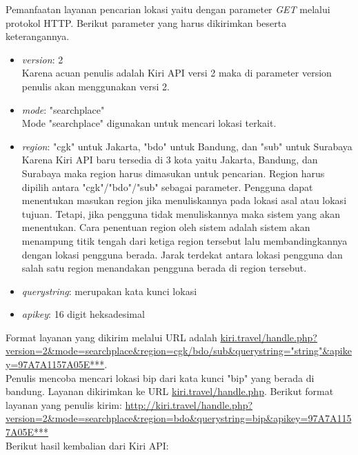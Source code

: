 Pemanfaatan layanan pencarian lokasi yaitu dengan parameter \textit{GET} melalui protokol HTTP. Berikut parameter yang harus dikirimkan beserta keterangannya.
\begin{itemize}
	\item \textit{version}: 2 \\
	Karena acuan penulis adalah Kiri API versi 2 maka di parameter version penulis akan menggunakan versi 2.
	\item \textit{mode}: "searchplace" \\
	Mode "searchplace" digunakan untuk mencari lokasi terkait.
	\item \textit{region}: "cgk" untuk Jakarta, "bdo" untuk Bandung, dan "sub" untuk Surabaya \\
	Karena Kiri API baru tersedia di 3 kota yaitu Jakarta, Bandung, dan Surabaya maka region harus dimasukan untuk pencarian. Region harus dipilih antara "cgk"/"bdo"/"sub" sebagai parameter. Pengguna dapat menentukan masukan region jika menuliskannya pada lokasi asal atau lokasi tujuan. Tetapi, jika pengguna tidak menuliskannya maka sistem yang akan menentukan. Cara penentuan region oleh sistem adalah sistem akan menampung titik tengah dari ketiga region tersebut lalu membandingkannya dengan lokasi pengguna berada. Jarak terdekat antara lokasi pengguna dan salah satu region menandakan pengguna berada di region tersebut.
	\item \textit{querystring}: merupakan kata kunci lokasi 
	\item \textit{apikey}: 16 digit heksadesimal
\end{itemize}
Format layanan yang dikirim melalui URL adalah \url{kiri.travel/handle.php?version=2&mode=searchplace&region=cgk/bdo/sub&querystring="string"&apikey=97A7A1157A05E***}.
\newline
\\Penulis mencoba mencari lokasi bip dari kata kunci "bip" yang berada di bandung. Layanan dikirimkan ke URL \url{kiri.travel/handle.php}. 
Berikut format layanan yang penulis kirim:\newline
{\url{http://kiri.travel/handle.php?version=2&mode=searchplace&region=bdo&querystring=bip&apikey=97A7A1157A05E***}}
\newline
\\Berikut hasil kembalian dari Kiri API: 

